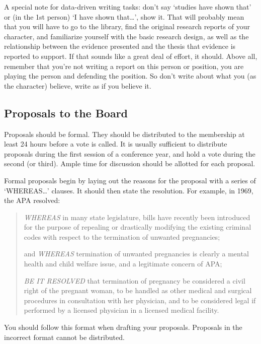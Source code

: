 \begin{refsection}
A special note for data-driven writing tasks: don't say `studies have shown that' or (in the 1st person) `I have shown that{\ldots}', show it. That will probably mean that you will have to go to the library, find the original research reports of your character, and familiarize yourself with the basic research design, as well as the relationship between the evidence presented and the thesis that evidence is reported to support. If that sounds like a great deal of effort, it should. Above all, remember that you're not writing a report on this person or position, you are playing the person and defending the position. So don't write about what you (as the character) believe, write as if you believe it.

\subsection{Proposals to the Board}
\label{proposalstotheboard}

Proposals should be formal. They should be distributed to the membership at least 24 hours before a vote is called. It is usually sufficient to distribute proposals during the first session of a conference year, and hold a vote during the second (or third). Ample time for discussion should be allotted for each proposal. 

Formal proposals begin by laying out the reasons for the proposal with a series of `WHEREAS{\ldots}' clauses. It should then state the resolution. For example, in 1969, the APA resolved:

\begin{quote}

\emph{WHEREAS} in many state legislature, bills have recently been introduced for the purpose of repealing or drastically modifying the existing criminal codes with respect to the termination of unwanted pregnancies;

and \emph{WHEREAS} termination of unwanted pregnancies is clearly a mental health and child welfare issue, and a legitimate concern of APA;

\emph{BE IT RESOLVED} that termination of pregnancy be considered a civil right of the pregnant woman, to be handled as other medical and surgical procedures in consultation with her physician, and to be considered legal if performed by a licensed physician in a licensed medical facility.
\end{quote}

You should follow this format when drafting your proposals. Proposals in the incorrect format cannot be distributed.


\end{refsection}
